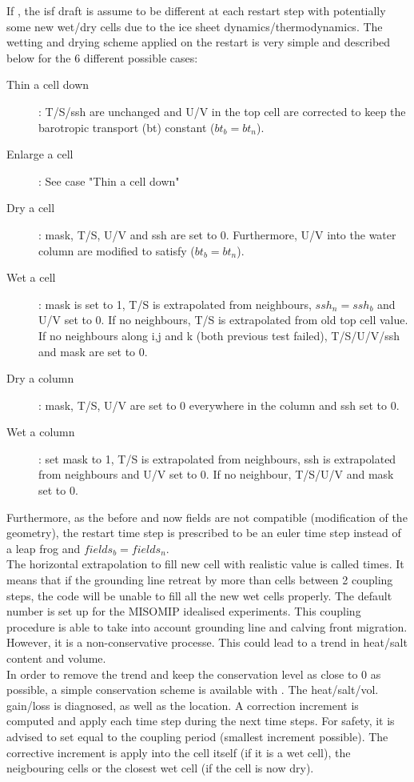 \documentclass[../main/NEMO_manual]{subfiles}
\begin{document}
If , the isf draft is assume to be different at each restart step with
potentially some new wet/dry cells due to the ice sheet dynamics/thermodynamics.
The wetting and drying scheme applied on the restart is very simple and described below for the 6 different possible cases:
\begin{description}
\item[Thin a cell down]:
  T/S/ssh are unchanged and U/V in the top cell are corrected to keep the barotropic transport (bt) constant
  ($bt_b=bt_n$).
\item[Enlarge  a cell]:
  See case "Thin a cell down"
\item[Dry a cell]:
  mask, T/S, U/V and ssh are set to 0.
  Furthermore, U/V into the water column are modified to satisfy ($bt_b=bt_n$).
\item[Wet a cell]: 
  mask is set to 1, T/S is extrapolated from neighbours, $ssh_n = ssh_b$ and U/V set to 0.
  If no neighbours, T/S is extrapolated from old top cell value. 
  If no neighbours along i,j and k (both previous test failed), T/S/U/V/ssh and mask are set to 0.
\item[Dry a column]:
	mask, T/S, U/V are set to 0 everywhere in the column and ssh set to 0.
\item[Wet a column]:
  set mask to 1, T/S is extrapolated from neighbours, ssh is extrapolated from neighbours and U/V set to 0.
  If no neighbour, T/S/U/V and mask set to 0.
\end{description}

Furthermore, as the before and now fields are not compatible (modification of the geometry),
the restart time step is prescribed to be an euler time step instead of a leap frog and $fields_b = fields_n$.\\

The horizontal extrapolation to fill new cell with realistic value is called  times.
It means that if the grounding line retreat by more than  cells between 2 coupling steps,
the code will be unable to fill all the new wet cells properly.
The default number is set up for the MISOMIP idealised experiments.
This coupling procedure is able to take into account grounding line and calving front migration.
However, it is a non-conservative processe. 
This could lead to a trend in heat/salt content and volume.\\

In order to remove the trend and keep the conservation level as close to 0 as possible,
a simple conservation scheme is available with .
The heat/salt/vol. gain/loss is diagnosed, as well as the location.
A correction increment is computed and apply each time step during the next  time steps. 
For safety, it is advised to set  equal to the coupling period (smallest increment possible).
The corrective increment is apply into the cell itself (if it is a wet cell), the neigbouring cells or the closest wet cell (if the cell is now dry).
\end{document}
